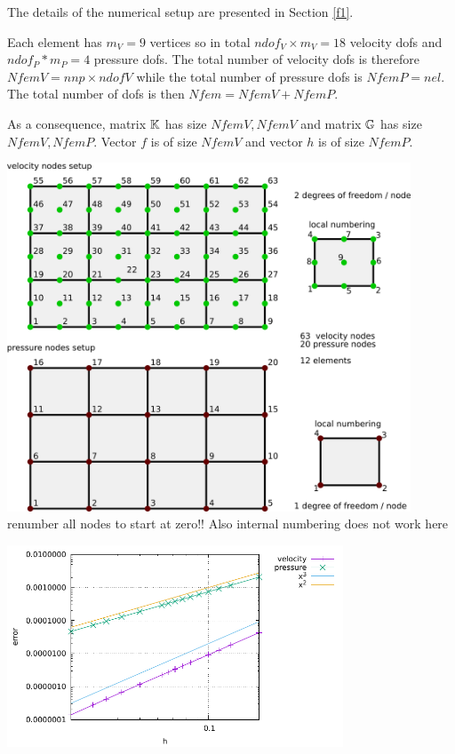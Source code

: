 The details of the numerical setup are presented in Section \ref{f1}.

Each element has $m_V=9$ vertices so in total $ndof_V\times m_V=18$ velocity dofs and 
$ndof_P*m_P=4$ pressure dofs. The total number of 
velocity dofs is therefore $NfemV=nnp \times ndofV$ while the total number of
pressure dofs is $NfemP=nel$. The total number of dofs is then $Nfem=NfemV+NfemP$.

As a consequence, matrix ${\mathbb{K}}$ has size $NfemV,NfemV$ and matrix ${\mathbb{G}}$ has size $NfemV,NfemP$.
Vector $f$ is of size $NfemV$ and vector $h$ is of size $NfemP$.  

\begin{center}
\includegraphics[width=12cm]{python_codes/fieldstone_saddlepoint_q2q1/q2q1setup}\\
{\color{red} renumber all nodes to start at zero!! Also internal numbering does not work here }
\end{center}


\begin{center}
\includegraphics[width=10cm]{python_codes/fieldstone_saddlepoint_q2q1/errors}
\end{center}
